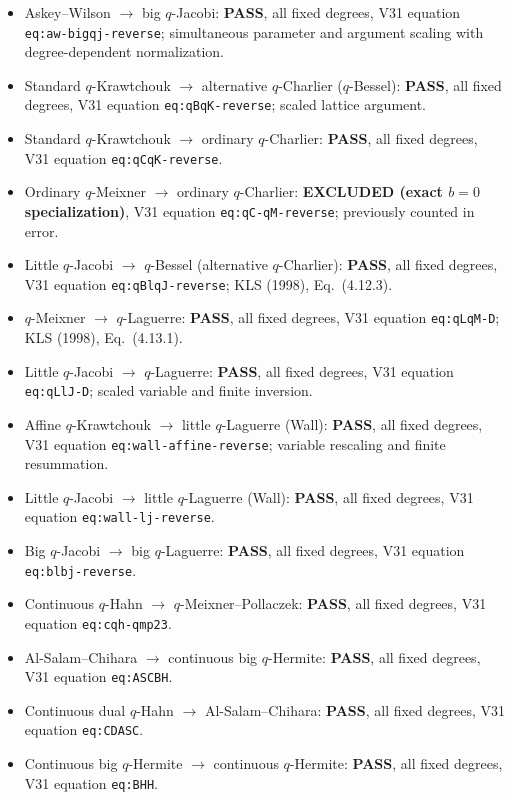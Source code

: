 \documentclass[11pt]{article}
\begin{document}
\begin{itemize}
\item Askey--Wilson $\to$ big $q$-Jacobi: \textbf{PASS}, all fixed degrees, V31 equation \texttt{eq:aw-bigqj-reverse}; simultaneous parameter and argument scaling with degree-dependent normalization.
\item Standard $q$-Krawtchouk $\to$ alternative $q$-Charlier ($q$-Bessel): \textbf{PASS}, all fixed degrees, V31 equation \texttt{eq:qBqK-reverse}; scaled lattice argument.
\item Standard $q$-Krawtchouk $\to$ ordinary $q$-Charlier: \textbf{PASS}, all fixed degrees, V31 equation \texttt{eq:qCqK-reverse}.
\item Ordinary $q$-Meixner $\to$ ordinary $q$-Charlier: \textbf{EXCLUDED (exact $b=0$ specialization)}, V31 equation \texttt{eq:qC-qM-reverse}; previously counted in error.
\item Little $q$-Jacobi $\to$ $q$-Bessel (alternative $q$-Charlier): \textbf{PASS}, all fixed degrees, V31 equation \texttt{eq:qBlqJ-reverse}; KLS (1998), Eq.~(4.12.3).
\item $q$-Meixner $\to$ $q$-Laguerre: \textbf{PASS}, all fixed degrees, V31 equation \texttt{eq:qLqM-D}; KLS (1998), Eq.~(4.13.1).
\item Little $q$-Jacobi $\to$ $q$-Laguerre: \textbf{PASS}, all fixed degrees, V31 equation \texttt{eq:qLlJ-D}; scaled variable and finite inversion.
\item Affine $q$-Krawtchouk $\to$ little $q$-Laguerre (Wall): \textbf{PASS}, all fixed degrees, V31 equation \texttt{eq:wall-affine-reverse}; variable rescaling and finite resummation.
\item Little $q$-Jacobi $\to$ little $q$-Laguerre (Wall): \textbf{PASS}, all fixed degrees, V31 equation \texttt{eq:wall-lj-reverse}.
\item Big $q$-Jacobi $\to$ big $q$-Laguerre: \textbf{PASS}, all fixed degrees, V31 equation \texttt{eq:blbj-reverse}.
\item Continuous $q$-Hahn $\to$ $q$-Meixner--Pollaczek: \textbf{PASS}, all fixed degrees, V31 equation \texttt{eq:cqh-qmp23}.
\item Al-Salam--Chihara $\to$ continuous big $q$-Hermite: \textbf{PASS}, all fixed degrees, V31 equation \texttt{eq:ASCBH}.
\item Continuous dual $q$-Hahn $\to$ Al-Salam--Chihara: \textbf{PASS}, all fixed degrees, V31 equation \texttt{eq:CDASC}.
\item Continuous big $q$-Hermite $\to$ continuous $q$-Hermite: \textbf{PASS}, all fixed degrees, V31 equation \texttt{eq:BHH}.

\end{itemize}
\end{document}

